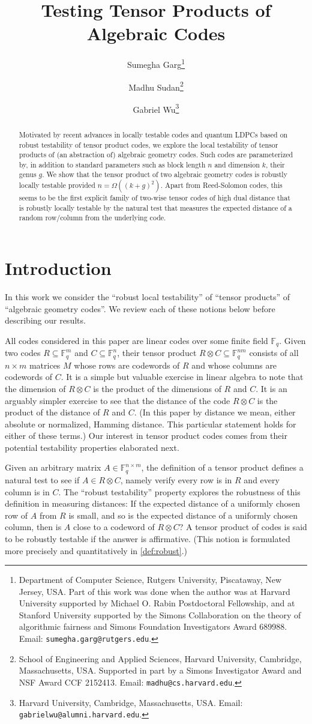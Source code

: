 \documentclass[11pt]{article}
\title{Testing Tensor Products of Algebraic Codes}
\author{Sumegha Garg\thanks{Department of Computer Science, Rutgers University, Piscataway, New Jersey, USA. Part of this work was done when the author was at Harvard University supported by Michael O. Rabin Postdoctoral Fellowship, and at Stanford University supported by the Simons Collaboration on the theory of algorithmic fairness and Simons Foundation Investigators Award 689988. Email: \texttt{sumegha.garg@rutgers.edu}.} \and Madhu Sudan\thanks{School of Engineering and Applied Sciences, Harvard University, Cambridge, Massachusetts, USA. Supported in part by a Simons Investigator Award and NSF Award CCF 2152413. Email: \texttt{madhu@cs.harvard.edu}.} \and Gabriel Wu\thanks{Harvard University, Cambridge, Massachusetts, USA. Email: \texttt{gabrielwu@alumni.harvard.edu}.}}
\date{}
\newcommand{\F}{\mathbb{F}}
\begin{document}
\maketitle

\begin{abstract}
    Motivated by recent advances in locally testable codes and quantum LDPCs based on robust testability of tensor product codes, we explore the local testability of tensor products of (an abstraction of) algebraic geometry codes. Such codes are parameterized by, in addition to standard parameters such as block length $n$ and dimension $k$, their genus $g$. We show that the tensor product of two algebraic geometry codes is robustly locally testable provided $n = \Omega((k+g)^2)$. Apart from Reed-Solomon codes, this seems to be the first explicit family of two-wise tensor codes of high dual distance that is robustly locally testable by the natural test that measures the expected distance of a random row/column from the underlying code. 
\end{abstract}




\section{Introduction}

In this work we consider the ``robust local testability'' of ``tensor products'' of ``algebraic geometry codes''. We review each of these notions below before describing our results.

All codes considered in this paper are linear codes over some finite field $\F_q$. Given two codes $R \subseteq \F_q^m$ and $C \subseteq \F_q^n$, their tensor product $R \otimes C \subseteq \F_q^{nm}$ consists of all $n \times m$ matrices $M$ whose rows are codewords of $R$ and whose columns are codewords of $C$. It is a simple but valuable exercise in linear algebra to note that the dimension of $R \otimes C$ is the product of the dimensions of $R$ and $C$. It is an arguably simpler exercise to see that the distance of the code $R\otimes C$ is the product of the distance of $R$ and $C$. (In this paper by distance we mean, either absolute or normalized, Hamming distance. This particular statement holds for either of these terms.) Our interest in tensor product codes comes from their potential testability properties elaborated next.

Given an arbitrary matrix $A \in \F_q^{n\times m}$, the definition of a tensor product defines a natural test to see if $A \in R \otimes C$, namely verify every row is in $R$ and every column is in $C$. The ``robust testability'' property explores the robustness of this definition in measuring distances: If the expected distance of a uniformly chosen row of $A$ from $R$ is small, and so is the expected distance of a uniformly chosen column, then is $A$ close to a codeword of $R \otimes C$? A tensor product of codes is said to be robustly testable if the answer is affirmative. (This notion is formulated more precisely and quantitatively in \cref{def:robust}.) 
\end{document}
